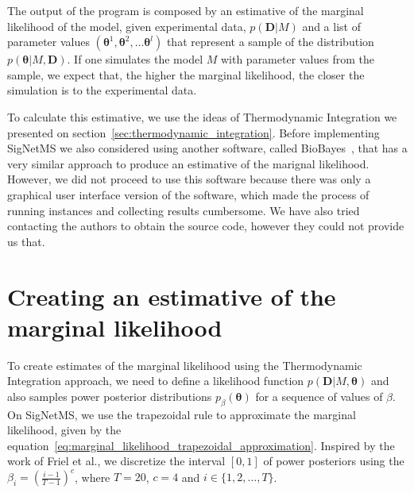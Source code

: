 The output of the program is composed by an estimative of the marginal
likelihood of the model, given experimental data, $p({\bm D} | M)$ and a
list of parameter values $({\bm \theta}^1, {\bm \theta}^2, \ldots {\bm
\theta}^l)$ that represent a sample of the distribution $p({\bm \theta}
| M, {\bm D})$. If one simulates the model $M$ with parameter values
from the sample, we expect that, the higher the marginal likelihood, the
closer the simulation is to the experimental data.

To calculate this estimative, we use the ideas of Thermodynamic
Integration we presented on section~\ref{sec:thermodynamic_integration}.
Before implementing SigNetMS we also considered using another software,
called BioBayes~\cite{Vyshemirsky2008}, that has a very similar approach
to produce an estimative of the marignal likelihood. However, we did not
proceed to use this software because there was only a graphical user
interface version of the software, which made the process of running
instances and collecting results cumbersome. We have also tried
contacting the authors to obtain the source code, however they could not
provide us that.

\section{Creating an estimative of the marginal likelihood}


To create estimates of the marginal likelihood using the Thermodynamic
Integration approach, we need to define a likelihood function $p({\bm
D}| M, {\bm \theta})$ and also samples power posterior distributions
$p_\beta({\bm \theta})$ for a sequence of values of $\beta$. On
SigNetMS, we use the trapezoidal rule to approximate the marginal
likelihood, given by the
equation~\ref{eq:marginal_likelihood_trapezoidal_approximation}. 
Inspired by the work of Friel et al., we discretize the
interval $[0, 1]$ of power posteriors using the $\beta_i =
\left(\frac{i - 1}{T - 1}\right)^c$, where $T = 20$, $c = 4$ and $i \in
\{1, 2, \ldots, T\}$.

